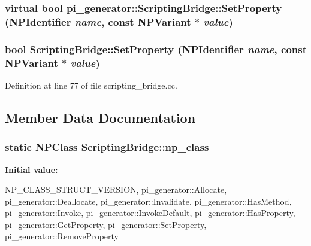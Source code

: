 \hypertarget{classpi__generator_1_1_scripting_bridge_a81c45706acaa62a4ba74cc2f0d0150c4}{
\subsubsection[{SetProperty}]{\setlength{\rightskip}{0pt plus 5cm}virtual bool pi\_\-generator::ScriptingBridge::SetProperty (NPIdentifier {\em name}, \/  const NPVariant $\ast$ {\em value})}}
\label{classpi__generator_1_1_scripting_bridge_a81c45706acaa62a4ba74cc2f0d0150c4}
\hypertarget{classpi__generator_1_1_scripting_bridge_ae73ff0ec0f70dfcd0e22534c8281f3e3}{
\subsubsection[{SetProperty}]{\setlength{\rightskip}{0pt plus 5cm}bool ScriptingBridge::SetProperty (NPIdentifier {\em name}, \/  const NPVariant $\ast$ {\em value})}}
\label{classpi__generator_1_1_scripting_bridge_ae73ff0ec0f70dfcd0e22534c8281f3e3}


Definition at line 77 of file scripting\_\-bridge.cc.



\subsection{Member Data Documentation}
\hypertarget{classpi__generator_1_1_scripting_bridge_a7a3e8318e9e315a116729cebceac5fd9}{
\subsubsection[{np\_\-class}]{\setlength{\rightskip}{0pt plus 5cm}static NPClass {\bf ScriptingBridge::np\_\-class}}}
\label{classpi__generator_1_1_scripting_bridge_a7a3e8318e9e315a116729cebceac5fd9}
{\bfseries Initial value:}
\begin{DoxyCode}
 {
  NP_CLASS_STRUCT_VERSION,
  pi_generator::Allocate,
  pi_generator::Deallocate,
  pi_generator::Invalidate,
  pi_generator::HasMethod,
  pi_generator::Invoke,
  pi_generator::InvokeDefault,
  pi_generator::HasProperty,
  pi_generator::GetProperty,
  pi_generator::SetProperty,
  pi_generator::RemoveProperty
}
\end{DoxyCode}


